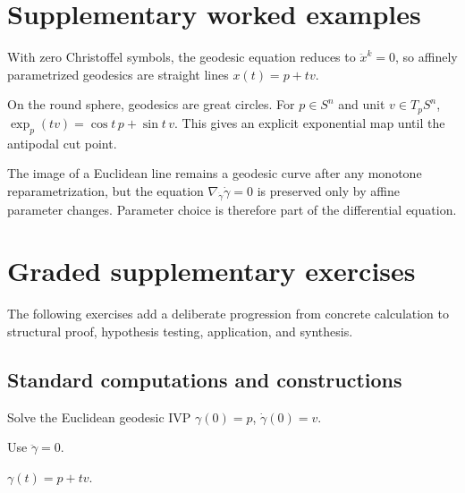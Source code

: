 \section{Supplementary worked examples}
\label{sec:vii23-pedagogy}

\begin{example}\label{ex:vii23-ped-01}
With zero Christoffel symbols, the geodesic equation reduces to \(\ddot x^k=0\), so affinely parametrized geodesics are straight lines \(x(t)=p+tv\).
\end{example}

\begin{example}\label{ex:vii23-ped-02}
On the round sphere, geodesics are great circles.  For \(p\in S^n\) and unit \(v\in T_pS^n\), \(\exp_p(tv)=\cos t\,p+\sin t\,v\).  This gives an explicit exponential map until the antipodal cut point.
\end{example}

\begin{example}\label{ex:vii23-ped-03}
The image of a Euclidean line remains a geodesic curve after any monotone reparametrization, but the equation \(\nabla_{\dot\gamma}\dot\gamma=0\) is preserved only by affine parameter changes.  Parameter choice is therefore part of the differential equation.
\end{example}

\section{Graded supplementary exercises}
The following exercises add a deliberate progression from concrete calculation to structural proof, hypothesis testing, application, and synthesis.

\subsection*{Standard computations and constructions}

\begin{exercise}\label{exr:vii23-ped-01}
Solve the Euclidean geodesic IVP \(\gamma(0)=p\), \(\dot\gamma(0)=v\).
\end{exercise}

\begin{hint}
Use \(\ddot\gamma=0\).
\end{hint}

\begin{solution}
\(\gamma(t)=p+tv\).
\end{solution}

